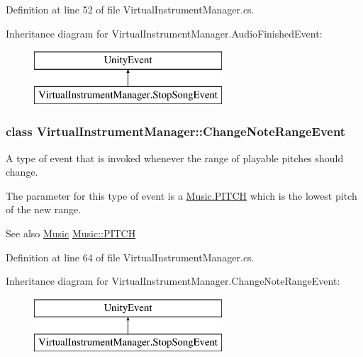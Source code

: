 Definition at line 52 of file Virtual\+Instrument\+Manager.\+cs.

Inheritance diagram for Virtual\+Instrument\+Manager.\+Audio\+Finished\+Event\+:\begin{figure}[H]
\begin{center}
\leavevmode
\includegraphics[height=2.000000cm]{group___v_i_m_event_types}
\end{center}
\end{figure}
\label{class_virtual_instrument_manager_1_1_change_note_range_event}
\subsubsection{class Virtual\+Instrument\+Manager\+:\+:Change\+Note\+Range\+Event}
A type of event that is invoked whenever the range of playable pitches should change. 

The parameter for this type of event is a \hyperlink{group___music_enums_ga508f69b199ea518f935486c990edac1d}{Music.\+P\+I\+T\+CH} which is the lowest pitch of the new range.

\begin{DoxySeeAlso}{See also}
\hyperlink{class_music}{Music} \hyperlink{group___music_enums_ga508f69b199ea518f935486c990edac1d}{Music\+::\+P\+I\+T\+CH} 
\end{DoxySeeAlso}


Definition at line 64 of file Virtual\+Instrument\+Manager.\+cs.

Inheritance diagram for Virtual\+Instrument\+Manager.\+Change\+Note\+Range\+Event\+:\begin{figure}[H]
\begin{center}
\leavevmode
\includegraphics[height=2.000000cm]{group___v_i_m_event_types}
\end{center}
\end{figure}
\label{class_virtual_instrument_manager_1_1_change_instrument_event}
